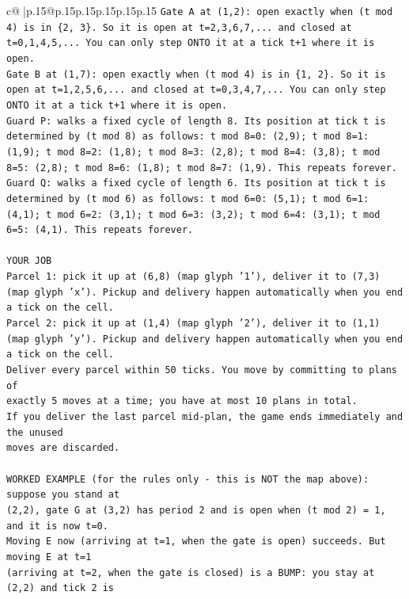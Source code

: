 \documentclass{article}
\begin{document}
{\begin{supertabular}{c@{$\;$}|p{.15\linewidth}@{}p{.15\linewidth}p{.15\linewidth}p{.15\linewidth}p{.15\linewidth}p{.15\linewidth}}
{{{\texttt{Gate A at (1,2): open exactly when (t mod 4) is in \{2, 3\}. So it is open at t=2,3,6,7,... and closed at t=0,1,4,5,... You can only step ONTO it at a tick t+1 where it is open.} \\
\texttt{Gate B at (1,7): open exactly when (t mod 4) is in \{1, 2\}. So it is open at t=1,2,5,6,... and closed at t=0,3,4,7,... You can only step ONTO it at a tick t+1 where it is open.} \\
\texttt{Guard P: walks a fixed cycle of length 8. Its position at tick t is determined by (t mod 8) as follows: t mod 8=0: (2,9); t mod 8=1: (1,9); t mod 8=2: (1,8); t mod 8=3: (2,8); t mod 8=4: (3,8); t mod 8=5: (2,8); t mod 8=6: (1,8); t mod 8=7: (1,9). This repeats forever.} \\
\texttt{Guard Q: walks a fixed cycle of length 6. Its position at tick t is determined by (t mod 6) as follows: t mod 6=0: (5,1); t mod 6=1: (4,1); t mod 6=2: (3,1); t mod 6=3: (3,2); t mod 6=4: (3,1); t mod 6=5: (4,1). This repeats forever.} \\
\\ 
\texttt{YOUR JOB} \\
\texttt{Parcel 1: pick it up at (6,8) (map glyph '1'), deliver it to (7,3) (map glyph 'x'). Pickup and delivery happen automatically when you end a tick on the cell.} \\
\texttt{Parcel 2: pick it up at (1,4) (map glyph '2'), deliver it to (1,1) (map glyph 'y'). Pickup and delivery happen automatically when you end a tick on the cell.} \\
\texttt{Deliver every parcel within 50 ticks. You move by committing to plans of} \\
\texttt{exactly 5 moves at a time; you have at most 10 plans in total.} \\
\texttt{If you deliver the last parcel mid{-}plan, the game ends immediately and the unused} \\
\texttt{moves are discarded.} \\
\\ 
\texttt{WORKED EXAMPLE (for the rules only {-} this is NOT the map above): suppose you stand at} \\
\texttt{(2,2), gate G at (3,2) has period 2 and is open when (t mod 2) = 1, and it is now t=0.} \\
\texttt{Moving E now (arriving at t=1, when the gate is open) succeeds. But moving E at t=1} \\
\texttt{(arriving at t=2, when the gate is closed) is a BUMP: you stay at (2,2) and tick 2 is} \\
}}}
\end{supertabular}}
\end{document}
